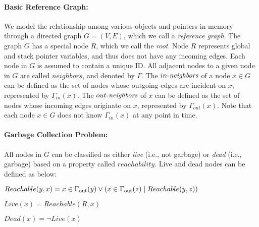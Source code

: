 \paragraph{Basic Reference Graph:}
We model the relationship among various objects and pointers in memory through a directed graph $G = (V, E)$, which we call a {\it reference graph}.
The graph $G$ has a special node $R$, which we call the {\it root}. Node $R$
represents
global and stack pointer variables, and
thus does not have any incoming edges.
Each node in $G$ is assumed to contain a unique ID. %
All adjacent nodes to a given node in $G$ are called $neighbors$, and denoted by $\Gamma$. The
$\mathop{\mbox{$in$-$\mathit{neighbors}$}}$ of a node $x\in G$ can be defined as the set of nodes whose outgoing edges
are incident on $x$, represented by $\Gamma_{in}(x)$. The $\mathop{\mbox{$out$-$\mathit{neighbors}$}}$ of $x$ can be defined as the set
of nodes whose incoming edges originate on $x$, represented by $\Gamma_{out}(x)$.
Note that each node $x\in G$ does not know $\Gamma_{in}(x)$ at any point in time.

\paragraph{Garbage Collection Problem:}
All nodes in $G$ can be classified as either {\em live} (i.e., not garbage) or {\em dead} (i.e., garbage) based on a property called
$reachability$. Live and dead nodes can be defined as below:




$Reachable(y,x) = x \in \Gamma_{\rm out}(y) \lor (x \in \Gamma_{\rm out}(z) \mid Reachable(y,z))$

$Live(x) = Reachable(R,x)$

$Dead(x) = \neg Live(x)$

